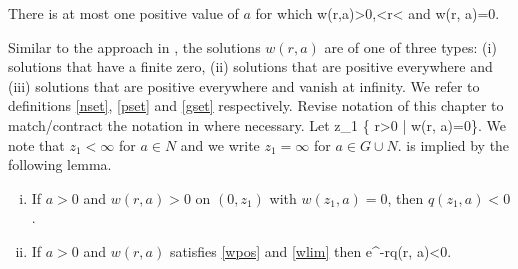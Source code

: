 \begin{theorem}\label{uniqthm}
There is at most one positive value of $a$ for which
\be\label{wpos}w(r,a)>0,<r<\infty\ee
and
\be\label{wlim} w(r, a)=0.\ee
\end{theorem}

Similar to the approach in , the solutions $w(r,a)$ are of one
of three types: (i) solutions that have a finite zero, (ii) solutions that are
positive everywhere and (iii) solutions that are positive everywhere and vanish
at infinity. We refer to definitions \eqref{nset}, \eqref{pset} and \eqref{gset}
respectively. {\red Revise notation of this chapter to match/contract the
notation in  where necessary.} Let 
\be\label{z1def}
z_1 \coloneqq \inf\left\{\; r>0 \;\middle|\; w(r, a)=0\;\right\}.
\ee
We note that $z_1<\infty$ for $a\in N$ and we write $z_1=\infty$ for $a\in G\cup
N$.  is implied by the following lemma.

\begin{lemma}\label{qneglem}
    \begin{enumerate}[(i)]
        \item If $a>0$ and $w(r, a)>0$ on $(0, z_1)$ with $w(z_1, a)=0$, then
            $q(z_1, a)<0$.
        \item If $a>0$ and $w(r, a)$ satisfies \eqref{wpos} and \eqref{wlim} then
            \be\label{qexplim}
                 e^{-r}q(r, a)<0.
            \ee
    \end{enumerate}
\end{lemma}

